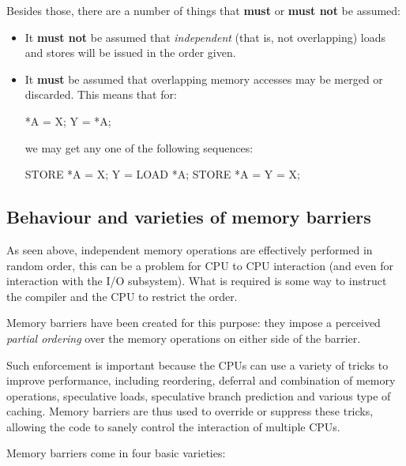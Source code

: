 Besides those, there are a number of things that \textbf{must} or \textbf{must not}
be assumed:

\begin{itemize}

\item It \textbf{must not} be assumed that \emph{independent} (that is, not overlapping)
loads and stores will be issued in the order given.

\item It \textbf{must} be assumed that overlapping memory accesses may be merged or
discarded. This means that for:

\begin{center}
*A = X; Y = *A;
\end{center}

we may get any one of the following sequences:

\begin{center}
STORE *A = X; Y = LOAD *A;
STORE *A = Y = X;
\end{center}

\end{itemize} 

\subsection{Behaviour and varieties of memory barriers}

As seen above, independent memory operations are effectively performed in random order,
this can be a problem for CPU to CPU interaction (and even for interaction with the
I/O subsystem). What is required is some way to instruct the compiler and
the CPU to restrict the order.

Memory barriers have been created for this purpose: they impose a perceived \emph{partial
ordering} over the memory operations on either side of the barrier.

Such enforcement is important because the CPUs can use a variety of tricks to improve
performance, including reordering, deferral and combination of memory operations,
speculative loads, speculative branch prediction and various type of caching. Memory
barriers are thus used to override or suppress these tricks, allowing the code to sanely
control the interaction of multiple CPUs.

Memory barriers come in four basic varieties:

